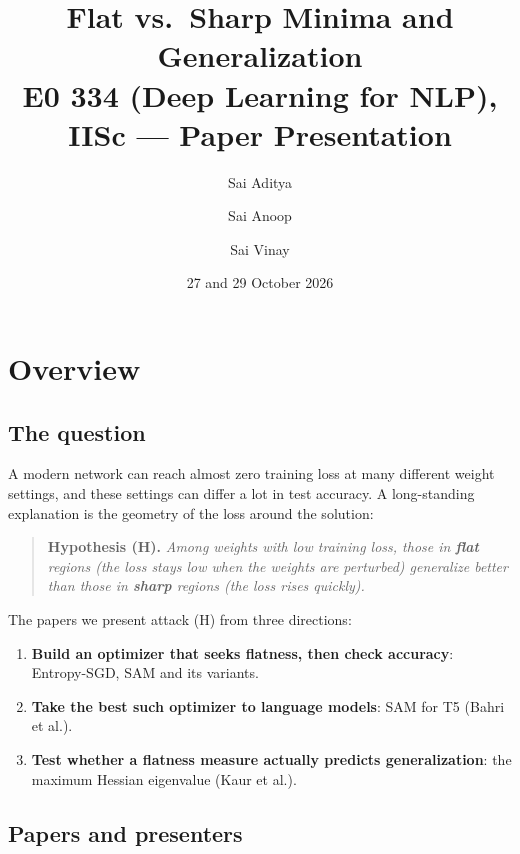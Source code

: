 \documentclass[11pt]{article}
\title{Flat vs.\ Sharp Minima and Generalization\\[4pt]
\large E0 334 (Deep Learning for NLP), IISc --- Paper Presentation}
\author{Sai Aditya \and Sai Anoop \and Sai Vinay}
\date{27 and 29 October 2026}
\theoremstyle{plain}
\begin{document}
\maketitle
\tableofcontents
\newpage

\section{Overview}

\subsection{The question}

A modern network can reach almost zero training loss at many different weight settings, and these
settings can differ a lot in test accuracy. A long-standing explanation is the geometry of the loss
around the solution:

\begin{quote}
\textbf{Hypothesis (H).} \emph{Among weights with low training loss, those in \textbf{flat} regions (the loss stays low when
the weights are perturbed) generalize better than those in \textbf{sharp} regions (the loss rises quickly).}
\end{quote}

The papers we present attack (H) from three directions:
\begin{enumerate}
  \item \textbf{Build an optimizer that seeks flatness, then check accuracy}: Entropy-SGD, SAM and its variants.
  \item \textbf{Take the best such optimizer to language models}: SAM for T5 (Bahri et al.).
  \item \textbf{Test whether a flatness measure actually predicts generalization}: the maximum Hessian eigenvalue (Kaur et al.).
\end{enumerate}

\subsection{Papers and presenters}
\end{document}
